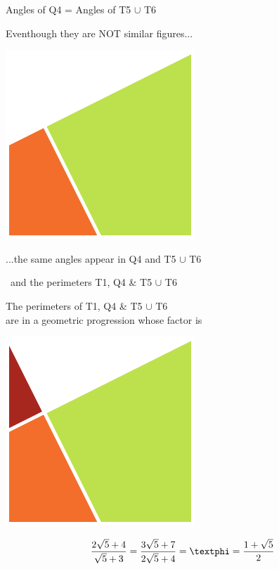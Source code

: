 \documentclass[14pt]{beamer}
\begin{document}

    \begin{frame}{Angles of Q4 = Angles of T5 $\cup$ T6}
        \begin{center}
            Eventhough they are NOT similar figures...
            \bigskip \bigskip

            \includegraphics[height=20ex]{figures/figure001g.pdf}

            \bigskip \bigskip

            ...the same angles appear in Q4 and T5 $\cup$ T6
        \end{center}
    \end{frame}


    \begin{frame}{\textphi\ and the perimeters T1, Q4 \& T5 $\cup$ T6}
        \begin{center}
            The perimeters of T1, Q4 \& T5 $\cup$ T6\\are in a geometric progression whose factor is \textphi

            \bigskip \bigskip

            \includegraphics[height=15ex]{figures/figure001h.pdf}

            $$\frac{2\sqrt{5} + 4}{\sqrt{5} + 3} = \frac{3\sqrt{5} + 7}{2\sqrt{5} + 4} = \text{\textphi} = \frac{1+\sqrt{5}}{2}$$
        \end{center}
    \end{frame}

\end{document}
